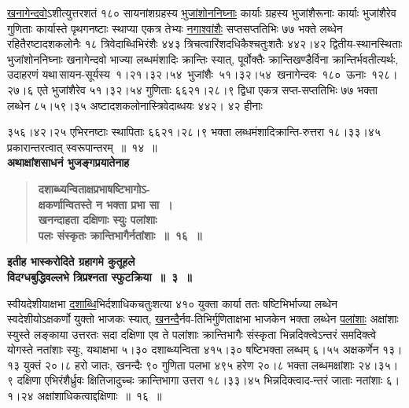 \documentclass[11pt, openany]{book}
\begin{document}
\hyperref[3.15]{खनागेन्दवो}ऽशीत्युत्तरशतं १८० सायनांशग्रहस्य \hyperref[3.15]{भुजांशोननिघ्नाः} कार्याः ग्रहस्य भुजांशैरूनाः कार्याः भुजांशैरेव गुणिताः कार्यास्ते पृथगनष्टाः स्थाप्या एकत्र तेभ्यः \hyperref[3.15]{नगाश्वांशैः} सप्तसप्ततिभिः ७७ भक्ते लब्धेन रहितैरष्टादशकलोनैः १८ त्रिवेदाब्धिभिरंशैः ४४३ त्रिचत्वारिंशदधिकैश्चतुःशतैः ४४२।४२ द्वितीय-स्थानस्थिताः \;भुजांशोननिघ्नाः \;खनागेन्दवो \;भाज्या \;लब्धमंशादिः \;क्रान्तिः स्यात्, पूर्वोक्तैः क्रान्तिखण्डैर्विना क्रान्तिर्भवतीत्यर्थः, उदाहरणं यथा\textendash \,सायन-सूर्यस्य \,१।२१।३२।५४ \,भुजांशैः \,५१।३२।५४ \,खनागेन्दवः \,१८० \,ऊनाः \,१२८। २७।६ एते भुजांशैरेव ५१।३२।५४ गुणिताः ६६२१।२८।९ द्विधा एकत्र सप्त-सप्ततिभिः ७७ भक्ता लब्धेन ८५।५९।३५ अष्टादशकलोनास्त्रिवेदाब्धयः ४४२। ४२ हीनाः

\newpage

\noindent ३५६।४२।२५ एभिरनष्टाः स्थापिताः ६६२१।२८।९ भक्ता लब्धमंशादिक्रान्ति-रुत्तरा १८।३३।४५ प्रकारान्तरत्वात् स्वरूपान्तरम्~॥~१४~॥\\

{\small \textbf{अथाक्षांशसाधनं भुजङ्गप्रयातेनाह\textendash }}

 \label{3.16}
\begin{quote}
{\large \textbf{{\color{purple}दशाब्ध्यन्विताक्षप्रभाषष्टिभागोऽ-\\
क्षकर्णान्वितस्ते न भक्ता प्रभा सा~। \\
खनन्दाहता दक्षिणाः स्युः पलांशाः \\
पलः संस्कृतः क्रान्तिभागैर्नतांशाः~॥~१६~॥}}}
\end{quote}

\begin{center}
{\large \textbf{इतीह भास्करोदिते ग्रहागमे कुतूहले\\
विदग्धबुद्धिवल्लभे त्रिप्रश्नता स्फुटक्रिया~॥~३~॥}}
\end{center}

स्वीयदेशीयाक्षभा \hyperref[3.16]{दशाब्धि}भिर्दशाधिकचतुःशत्या ४१० युक्ता कार्या ततः षष्टिभिर्भाज्या लब्धेन स्वदेशीयोऽक्षकर्णो युक्तो भाजकः स्यात्, \hyperref[3.16]{खनन्दै}र्नव-तिभिर्गुणिताक्षभा भाजकेन भक्ता लब्धेन \hyperref[3.16]{पलांशाः} अक्षांशाः स्युस्ते लङ्काया उत्तरतः सदा दक्षिणा एव ते पलांशाः क्रान्तिभागैः संस्कृता भिन्नदिक्त्वेऽन्तरं समदिक्त्वे योगस्ते नतांशाः स्युः, यथाक्षभा ५।३० दशाब्ध्यन्विता ४१५।३० षष्टिभक्ता लब्धम् ६।५५ अक्षकर्णेन १३।१३ युक्तं २०।८ हरो जातः, खनन्दैः ९० गुणिता पलभा ४९५ हरेण २०।८ भक्ता लब्धमक्षांशाः २४।३५।९ दक्षिणा एभिरंशैर्ध्रुवः क्षितिजादुच्चः क्रान्तिभागा उत्तरा १८।३३।४५ भिन्नदिक्त्वाद-न्तरं जाताः नतांशाः ६।१।२४ अक्षांशाधिकत्वाद्दक्षिणाः~॥~१६~॥
\vspace{2mm}
\end{document}
